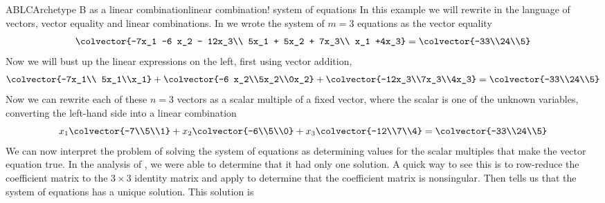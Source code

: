 \begin{example}{ABLC}{Archetype B as a linear combination}{linear combination! system of equations}
In this example we will rewrite  in the language of vectors, vector equality and linear combinations.  In  we wrote the  system of $m=3$ equations as the vector equality
%
\begin{equation*}
\colvector{-7x_1 -6 x_2 - 12x_3\\ 5x_1  + 5x_2 + 7x_3\\ x_1 +4x_3}
=
\colvector{-33\\24\\5}
\end{equation*}
%
Now we will bust up the linear expressions on the left, first using vector addition,
%
\begin{equation*}
\colvector{-7x_1\\ 5x_1\\x_1}+
\colvector{-6 x_2\\5x_2\\0x_2}+
\colvector{-12x_3\\7x_3\\4x_3}
=
\colvector{-33\\24\\5}
\end{equation*}
%
Now we can rewrite each of these $n=3$ vectors as a scalar multiple of a fixed vector, where the scalar is one of the unknown variables, converting the left-hand side into a linear combination
%
\begin{equation*}
x_1\colvector{-7\\5\\1}+
x_2\colvector{-6\\5\\0}+
x_3\colvector{-12\\7\\4}
=
\colvector{-33\\24\\5}
\end{equation*}
%
We can now interpret the problem of solving the system of equations as determining values for the scalar multiples that make the vector equation true.  In the analysis of , we were able to determine that it had only one solution.  A quick way to see this is to row-reduce the coefficient matrix to the $3\times 3$ identity matrix and apply  to determine that the coefficient matrix is nonsingular.  Then  tells us that the system of equations has a unique solution.  This solution is

\end{example}

